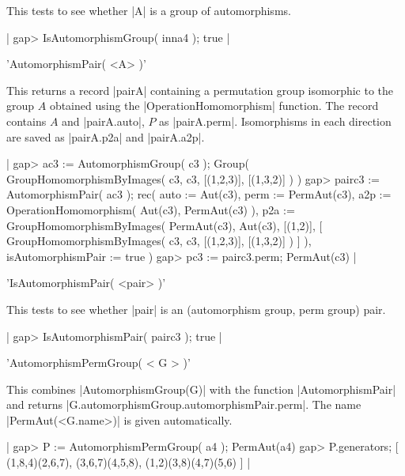 This tests to see whether |A| is a group of automorphisms.

|    gap> IsAutomorphismGroup( inna4 );
    true |

%

'AutomorphismPair( <A> )'

This   returns  a   record |pairA|  containing    a  permutation group
isomorphic to the group $A$ obtained using the |OperationHomomorphism|
function.       The record contains   $A$    and  |pairA.auto|, $P$ as
|pairA.perm|.  Isomorphisms in each direction are saved as |pairA.p2a|
and |pairA.a2p|.

|    gap> ac3 := AutomorphismGroup( c3 );
    Group( GroupHomomorphismByImages( c3, c3, [(1,2,3)], [(1,3,2)] ) )
    gap> pairc3 := AutomorphismPair( ac3 );
    rec(
      auto := Aut(c3),
      perm := PermAut(c3),
      a2p := OperationHomomorphism( Aut(c3), PermAut(c3) ),
      p2a := GroupHomomorphismByImages( PermAut(c3), Aut(c3), [(1,2)], 
        [ GroupHomomorphismByImages( c3, c3, [(1,2,3)], [(1,3,2)] ) ] ),
      isAutomorphismPair := true )
    gap> pc3 := pairc3.perm;
    PermAut(c3)  |

%

'IsAutomorphismPair( <pair> )'

This tests to see whether |pair| is an (automorphism group, perm group) pair.

|    gap> IsAutomorphismPair( pairc3 );
    true |

%

'AutomorphismPermGroup( < G > )'

This    combines  |AutomorphismGroup(G)|     with  the        function
|AutomorphismPair|                       and                   returns
|G.automorphismGroup.automorphismPair.perm|.            The       name
|PermAut(<G.name>)| is given automatically.

|    gap> P := AutomorphismPermGroup( a4 );
    PermAut(a4)
    gap> P.generators;
    [ (1,8,4)(2,6,7), (3,6,7)(4,5,8), (1,2)(3,8)(4,7)(5,6) ]  |

%

